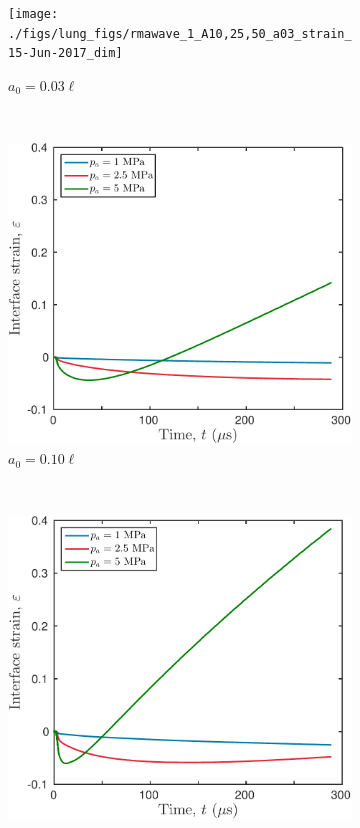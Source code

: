 \begin{figure}
  \centering
  \begin{subfigure}[b]{0.49\textwidth}
    \texttt{[image: ./figs/lung\_figs/rmawave\_1\_A10,25,50\_a03\_strain\_15-Jun-2017\_dim]}
    \caption{\label{fig:strain_multi-pa_a03} $a_0 = 0.03\ell$}
  \end{subfigure}
  ~ 
  \begin{subfigure}[b]{0.49\textwidth}
    \includegraphics[width=\textwidth]{./figs/lung_figs/rmawave_1_A10,25,50_a10_strain_15-Jun-2017_dim}
    \caption{\label{fig:strain_multi-pa_a10} $a_0 = 0.10\ell$}
  \end{subfigure}
  ~ 
  \begin{subfigure}[b]{0.49\textwidth}
    \includegraphics[width=\textwidth]{./figs/lung_figs/rmawave_1_A10,25,50_a30_strain_15-Jun-2017_dim}

\end{subfigure}
\end{figure}
